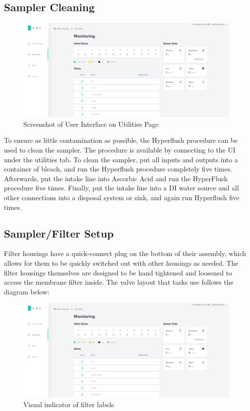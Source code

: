 \documentclass[11pt, letterpaper]{article}
\begin{document}
\subsection{Sampler Cleaning}
\begin{figure}[H]
	\centering
	\includegraphics[scale=0.35]{./Assets/UI.png} %
	\caption{Screenshot of User Interface on Utilities Page}
\end{figure}
\par\noindent
To ensure as little contamination as possible, the Hyperflush procedure can be used to clean the sampler. The procedure is available by connecting to the UI under the utilities tab. To clean the sampler, put all inputs and outputs into a container of bleach, and run the Hyperflush procedure completely five times. Afterwards, put the intake line into Ascorbic Acid and run the HyperFlush procedure five times. Finally, put the intake line into a DI water source and all other connections into a disposal system or sink, and again run Hyperflush five times. 




\subsection{Sampler/Filter Setup}
Filter housings have a quick-connect plug on the bottom of their assembly, which allows for them to be quickly switched out with other housings as needed. The filter housings themselves are designed to be hand tightened and loosened to access the membrane filter inside. The valve layout that tasks use follows the diagram below:
 
\begin{figure}[H]
	\centering
	\includegraphics[scale=0.35]{./Assets/UI.png} %
	\caption{Visual indicator of filter labels}
\end{figure}
\end{document}
